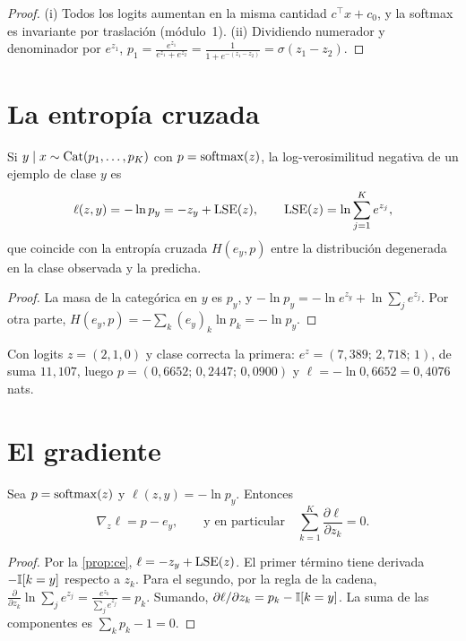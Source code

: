 \begin{proof}
(i) Todos los logits aumentan en la misma cantidad $c^{\top}x+c_0$, y la softmax es invariante por traslación (módulo~1). (ii) Dividiendo numerador y denominador por $e^{z_1}$, $p_1=\frac{e^{z_1}}{e^{z_1}+e^{z_2}}=\frac{1}{1+e^{-(z_1-z_2)}}=\sigma(z_1-z_2)$.
\end{proof}

\section{La entropía cruzada}

\begin{proposicion}\label{prop:ce}
Si $y\mid x\sim\operatorname{Cat}(p_1,\dots,p_K)$ con $p=\operatorname{softmax}(z)$, la log-verosimilitud negativa de un ejemplo de clase $y$ es
\[
\ell(z,y)=-\ln p_y=-z_y+\operatorname{LSE}(z),\qquad \operatorname{LSE}(z)=\ln\sum_{j=1}^{K}e^{z_j},
\]
que coincide con la entropía cruzada $H(e_y,p)$ entre la distribución degenerada en la clase observada y la predicha.
\end{proposicion}

\begin{proof}
La masa de la categórica en $y$ es $p_y$, y $-\ln p_y=-\ln e^{z_y}+\ln\sum_je^{z_j}$. Por otra parte, $H(e_y,p)=-\sum_k(e_y)_k\ln p_k=-\ln p_y$.
\end{proof}

\begin{ejemplo}\label{ej:softmax}
Con logits $z=(2,1,0)$ y clase correcta la primera: $e^{z}=(7{,}389;\,2{,}718;\,1)$, de suma $11{,}107$, luego $p=(0{,}6652;\,0{,}2447;\,0{,}0900)$ y $\ell=-\ln 0{,}6652=0{,}4076$ nats.
\end{ejemplo}

\section{El gradiente}

\begin{teorema}\label{teo:grad-softmax}
Sea $p=\operatorname{softmax}(z)$ y $\ell(z,y)=-\ln p_y$. Entonces
\[
\nabla_z\ell=p-e_y,\qquad\text{y en particular}\quad\sum_{k=1}^{K}\frac{\partial\ell}{\partial z_k}=0.
\]
\end{teorema}

\begin{proof}
Por la \cref{prop:ce}, $\ell=-z_y+\operatorname{LSE}(z)$. El primer término tiene derivada $-\mathbb{I}[k=y]$ respecto a $z_k$. Para el segundo, por la regla de la cadena, $\frac{\partial}{\partial z_k}\ln\sum_je^{z_j}=\frac{e^{z_k}}{\sum_je^{z_j}}=p_k$. Sumando, $\partial\ell/\partial z_k=p_k-\mathbb{I}[k=y]$. La suma de las componentes es $\sum_kp_k-1=0$.
\end{proof}

